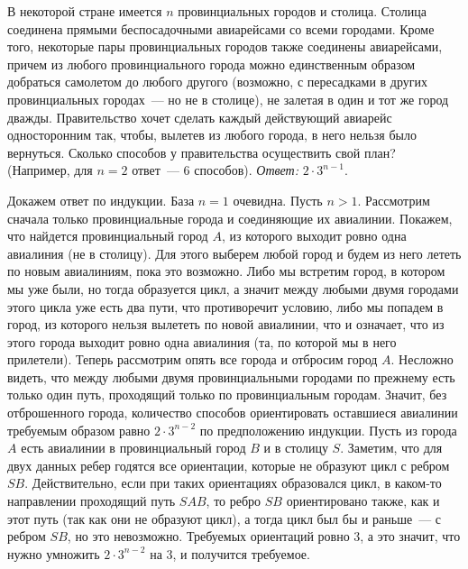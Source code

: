 \problem
В некоторой стране имеется $n$ провинциальных городов и столица.
Столица соединена прямыми беспосадочными авиарейсами со всеми городами.
Кроме того, некоторые пары провинциальных городов также соединены авиарейсами,
причем из любого провинциального города можно единственным образом добраться
самолетом до любого другого
(возможно, с пересадками в других провинциальных городах~--- но не в столице),
не залетая в один и тот же город дважды.
Правительство хочет сделать каждый действующий авиарейс односторонним
так, чтобы, вылетев из любого города, в него нельзя было вернуться.
Сколько способов у правительства осуществить свой план?
(Например, для $n = 2$ ответ~--- $6$ способов).
\solution
\emph{Ответ:} $2 \cdot 3^{n-1}$.
\par
Докажем ответ по индукции.
База $n = 1$ очевидна.
Пусть $n > 1$.
Рассмотрим сначала только провинциальные города и соединяющие их авиалинии.
Покажем, что найдется провинциальный город $A$, из которого выходит ровно одна
авиалиния (не в столицу).
Для этого выберем любой город и будем из него лететь по новым авиалиниям, пока
это возможно.
Либо мы встретим город, в котором мы уже были, но тогда образуется цикл, а
значит между любыми двумя городами этого цикла уже есть два пути, что
противоречит условию, либо мы попадем в город, из которого нельзя вылететь по
новой авиалинии, что и означает, что из этого города выходит ровно одна
авиалиния (та, по которой мы в него прилетели).
Теперь рассмотрим опять все города и отбросим город $A$.
Несложно видеть, что между любыми двумя провинциальными городами по прежнему
есть только один путь, проходящий только по провинциальным городам.
Значит, без отброшенного города, количество способов ориентировать оставшиеся
авиалинии требуемым образом равно $2 \cdot 3^{n-2}$ по предположению индукции.
Пусть из города $A$ есть авиалинии в провинциальный город $B$ и в столицу $S$.
Заметим, что для двух данных ребер годятся все ориентации, которые не образуют
цикл с ребром $SB$.
Действительно, если при таких ориентациях образовался цикл, в каком-то
направлении проходящий путь $SAB$, то ребро $SB$ ориентировано также, как и
этот путь (так как они не образуют цикл), а тогда цикл был бы и раньше~---
с ребром $SB$, но это невозможно.
Требуемых ориентаций ровно 3, а это значит, что нужно умножить
$2 \cdot 3^{n-2}$ на 3, и получится требуемое. 
\endproblem
